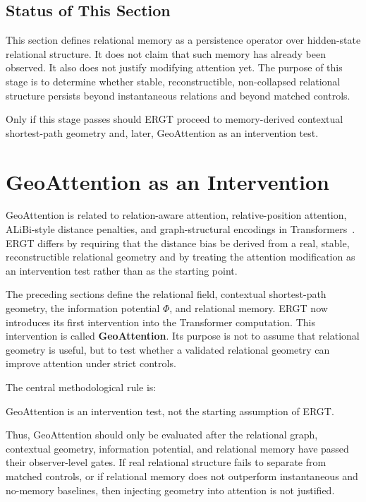 \documentclass[11pt]{article}
\begin{document}
\subsection{Status of This Section}

This section defines relational memory as a persistence operator over hidden-state relational structure. It does not claim that such memory has already been observed. It also does not justify modifying attention yet. The purpose of this stage is to determine whether stable, reconstructible, non-collapsed relational structure persists beyond instantaneous relations and beyond matched controls.

Only if this stage passes should ERGT proceed to memory-derived contextual shortest-path geometry and, later, GeoAttention as an intervention test.


\section{GeoAttention as an Intervention}
\noindent GeoAttention is related to relation-aware attention, relative-position attention, ALiBi-style distance penalties, and graph-structural encodings in Transformers~\cite{shaw2018self,press2021train,ying2021graphormer}. ERGT differs by requiring that the distance bias be derived from a real, stable, reconstructible relational geometry and by treating the attention modification as an intervention test rather than as the starting point.


The preceding sections define the relational field, contextual shortest-path geometry, the information potential $\Phi$, and relational memory. ERGT now introduces its first intervention into the Transformer computation. This intervention is called \textbf{GeoAttention}. Its purpose is not to assume that relational geometry is useful, but to test whether a validated relational geometry can improve attention under strict controls.

The central methodological rule is:
\begin{ergtclaim}
GeoAttention is an intervention test, not the starting assumption of ERGT.
\end{ergtclaim}
Thus, GeoAttention should only be evaluated after the relational graph, contextual geometry, information potential, and relational memory have passed their observer-level gates. If real relational structure fails to separate from matched controls, or if relational memory does not outperform instantaneous and no-memory baselines, then injecting geometry into attention is not justified.
\end{document}
